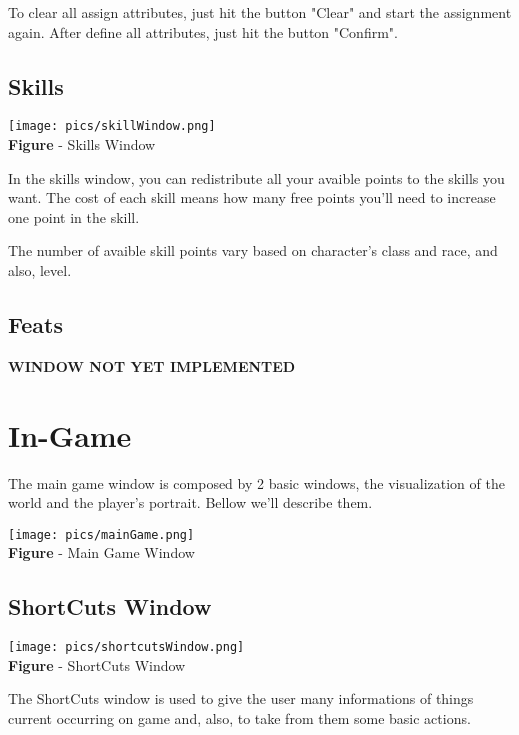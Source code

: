 \documentclass[ letterpaper,12pt]{article}
\begin{document}
To clear all assign attributes, just hit the button "Clear" and start the
assignment again. After define all attributes, just hit the button "Confirm".

\subsection{Skills}

\begin{center}
  \texttt{[image: pics/skillWindow.png]}
\\{\bf Figure} - Skills Window
\end{center}

In the skills window, you can redistribute all your avaible points to the skills you want. The cost of each skill means how many free points you'll need to increase one point in the skill.

The number of avaible skill points vary based on character's class and race, and also, level.

\subsection{Feats}

{\bf WINDOW NOT YET IMPLEMENTED}

\section{In-Game}

The main game window is composed by 2 basic windows, the visualization of the world and the player's portrait. Bellow we'll describe them.

\begin{center}
  \texttt{[image: pics/mainGame.png]}
\\{\bf Figure} - Main Game Window
\end{center}

\subsection{ShortCuts Window}

\begin{center}
  \texttt{[image: pics/shortcutsWindow.png]}
\\{\bf Figure} - ShortCuts Window
\end{center}

The ShortCuts window is used to give the user many informations of things
current occurring on game and, also, to take from them some basic actions.
\end{document}
